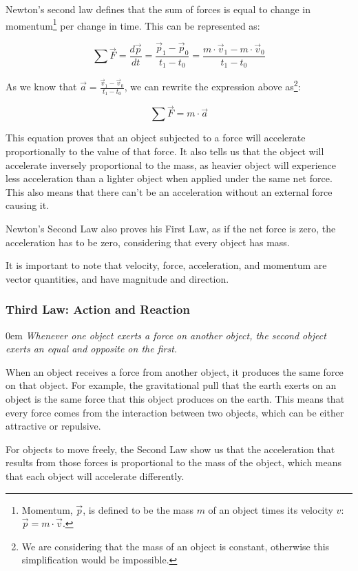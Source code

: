 \documentclass[12pt,twoside,a4paper]{article}
\newcommand{\ds}{\displaystyle}
\renewcommand{\quote}[1]{\og#1\fg{}}
\begin{document}
	Newton's second law defines that the sum of forces is equal to change in momentum\footnote{Momentum, $\vec{p}$, is defined to be the mass $m$ of an object times its velocity $v$: $\vec{p} = m \cdot \vec{v}$.} per change in time. This can be represented as:
	
	$$\sum \vec{F} = \frac{d\vec{p}}{dt} = \frac{\vec{p}_1 - \vec{p}_0}{t_1 - t_0} = \frac{m \cdot \vec{v}_1 - m \cdot \vec{v}_0}{t_1 - t_0}$$
	
	As we know that $\ds \vec{a} = \frac{\vec{v}_1 - \vec{v}_0}{t_1 - t_0}$, we can rewrite the expression above as\footnote{We are considering that the mass of an object is constant, otherwise this simplification would be impossible.}:
	
	$$\sum \vec{F} = m \cdot \vec{a}$$
	
	This equation proves that an object subjected to a force will accelerate proportionally to the value of that force. It also tells us that the object will accelerate inversely proportional to the mass, as heavier object will experience less acceleration than a lighter object when applied under the same net force. This also means that there can't be an acceleration without an external force causing it.
	
	Newton's Second Law also proves his First Law, as if the net force is zero, the acceleration has to be zero, considering that every object has mass.
	
	It is important to note that velocity, force, acceleration, and momentum are vector quantities, and have magnitude and direction.
	
	\subsubsection*{Third Law: Action and Reaction}
	{\parindent0em
		\textit{\quote{Whenever one object exerts a force on another object, the second object exerts an equal and opposite on the first.}}%
	}

	When an object receives a force from another object, it produces the same force on that object. For example, the gravitational pull that the earth exerts on an object is the same force that this object produces on the earth. This means that every force comes from the interaction between two objects, which can be either attractive or repulsive.
	
	For objects to move freely, the Second Law show us that the acceleration that results from those forces is proportional to the mass of the object, which means that each object will accelerate differently.
	
\end{document}
